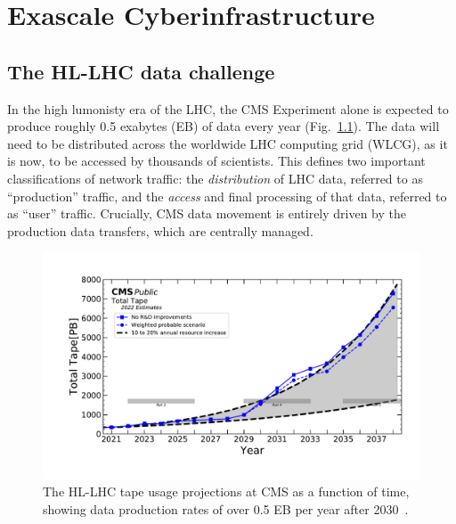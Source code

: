 \chapter{Exascale Cyberinfrastructure}\label{ch:cyber}

\section{The HL-LHC data challenge}
In the high lumonisty era of the LHC, the CMS Experiment alone is expected to produce roughly 0.5 exabytes (EB) of data every year\footnotemark{} (Fig.~\ref{fig:tape_projections}). 
The data will need to be distributed across the worldwide LHC computing grid (WLCG), as it is now, to be accessed by thousands of scientists. 
This defines two important classifications of network traffic: the \textit{distribution} of LHC data, referred to as ``production'' traffic, and the \textit{access} and final processing of that data, referred to as ``user'' traffic. 
Crucially, CMS data movement is entirely driven by the production data transfers, which are centrally managed. 

\begin{figure}[htb]
  \centering
  \includegraphics[width=.9\textwidth]{fig/cyber/tape_cms2022.pdf}
  \caption{The HL-LHC tape usage projections at CMS as a function of time, showing data production rates of over 0.5 EB per year after 2030~\cite{CMSComputingReport2022}.}
  \label{fig:tape_projections}
\end{figure}

